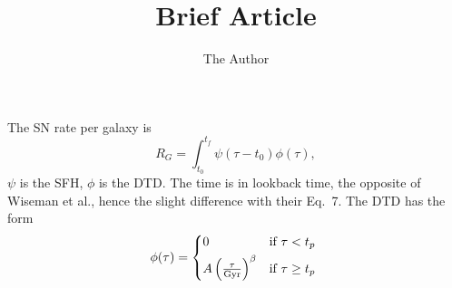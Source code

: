 \documentclass[11pt, oneside]{article}   	%
\title{Brief Article}
\author{The Author}
\begin{document}
\maketitle
The SN rate per galaxy is
\begin{equation}
R_G=\int_{t_0}^{t_f} \psi(\tau-t_0) \phi(\tau),
\end{equation}
$\psi$ is the SFH, $\phi$ is the DTD.  The time is in lookback time, the opposite of Wiseman et al., hence the slight difference with their Eq.\ 7.
The DTD has the form
\begin{equation}
\phi(\tau) =  
\begin{cases*} 
            0  &  if $\tau < t_p$  \\
             A \left(\frac{\tau}{\mathrm{Gyr}} \right)^\beta  & if $\tau \geq t_p$ 
          \end{cases*}
\end{equation}
\end{document}
